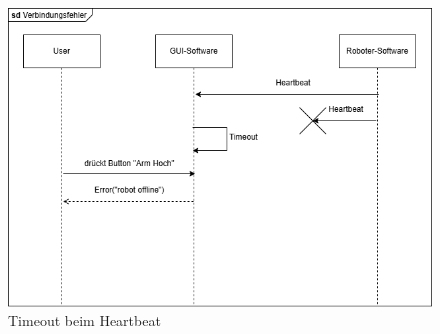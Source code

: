 \begin{figure}[h]  
    \centering
    \includegraphics[width=0.8\linewidth]{Docs/diagrams/Verbindungsabbruch.png}
    \caption{Timeout beim Heartbeat}
    \label{fig:Fehlerfall}
\end{figure}



